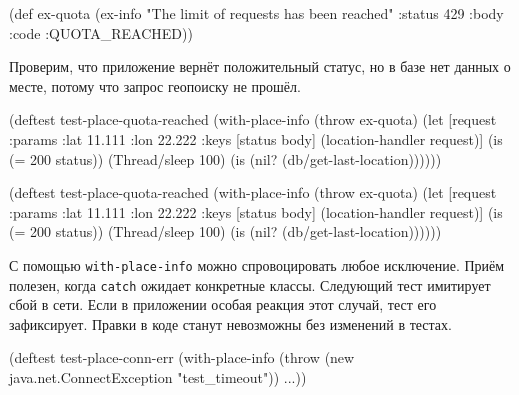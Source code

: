 \else

\begin{english}
  \begin{clojure}
(def ex-quota
  (ex-info "The limit of requests has been reached"
           {:status 429 :body {:code :QUOTA_REACHED}}))
  \end{clojure}
\end{english}

\fi

Проверим, что приложение вернёт положительный статус, но в базе нет данных о
месте, потому что запрос геопоиску не прошёл.

\ifnarrow

\begin{english}
  \begin{clojure}
(deftest test-place-quota-reached
 (with-place-info
   (throw ex-quota)
   (let [request {:params {:lat 11.111
                          :lon 22.222}}
        {:keys [status body]}
        (location-handler request)]
      (is (= 200 status))
      (Thread/sleep 100)
      (is (nil?
            (db/get-last-location))))))
  \end{clojure}
\end{english}

\else

\begin{english}
  \begin{clojure}
(deftest test-place-quota-reached
  (with-place-info
    (throw ex-quota)
    (let [request {:params {:lat 11.111 :lon 22.222}}
          {:keys [status
                  body]} (location-handler request)]
      (is (= 200 status))
      (Thread/sleep 100)
      (is (nil? (db/get-last-location))))))
  \end{clojure}
\end{english}

\fi

С помощью \verb|with-place-info| можно спровоцировать любое исключение. Приём
полезен, когда \verb|catch| ожидает конкретные классы. Следующий тест имитирует
сбой в сети. Если в приложении особая реакция этот случай, тест его
зафиксирует. Правки в коде станут невозможны без изменений в тестах.


\ifnarrow

\begin{english}
  \begin{clojure}
(deftest test-place-conn-err
  (with-place-info
    (throw (new java.net.ConnectException
             "test_timeout"))
    ...))
  \end{clojure}
\end{english}

